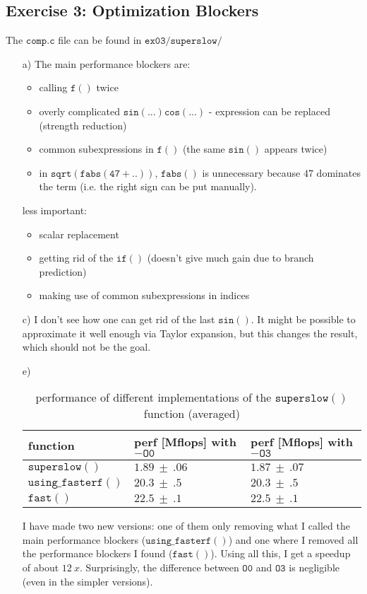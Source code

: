 \documentclass[11pt]{article}
\begin{document}
\subsection*{Exercise 3: Optimization Blockers}
	The $\mathtt{comp.c}$ file can be found in $\mathtt{ex03/superslow/}$
	\begin{itemize}
		\item[a)] The main performance blockers are:
		\begin{itemize}
			\item calling $\mathtt{f()}$ twice
			\item overly complicated $\mathtt{sin(...)cos(...)}$ - expression can be replaced (strength reduction)
			\item common subexpressions in $\mathtt{f()}$ (the same $\mathtt{sin()}$ appears twice)
			\item in $\mathtt{sqrt(fabs(47 + ..))}$, $\mathtt{fabs()}$ is unnecessary because $47$ dominates the term (i.e. the right sign can be put manually).
		\end{itemize}
		less important:
		\begin{itemize}
			\item scalar replacement
			\item getting rid of the $\mathtt{if()}$ (doesn't give much gain due to branch prediction)
			\item making use of common subexpressions in indices
		\end{itemize}
		\item[c)] I don't see how one can get rid of the last $\mathtt{sin()}$. It might be possible to approximate it well enough via Taylor expansion, but this changes the result, which should not be the goal.
	\item[e)]
	\begin{table}[H]\centering
		\begin{tabular}  {l||l|l}
			function & perf [Mflops] with $-\mathtt{O0}$& perf [Mflops] with $-\mathtt{O3}$\\\hline\hline
			$\mathtt{superslow()}$&$1.89~\pm~.06$ & $1.87~\pm~.07$\\\hline
			$\mathtt{using\_fasterf()}$&$20.3~\pm~.5$ & $20.3~\pm~.5$\\\hline
			$\mathtt{fast()}$&$22.5~\pm~.1$ & $22.5~\pm~.1$\\
			
		\end{tabular}
		\caption{performance of different implementations of the $\mathtt{superslow()}$ function (averaged)}
	\end{table}
	I have made two new versions: one of them only removing what I called the main performance blockers ($\mathtt{using\_fasterf()}$) and one where I removed all the performance blockers I found ($\mathtt{fast()}$). Using all this, I get a speedup of about $12 ~x$. Surprisingly, the difference between $\mathtt{O0}$ and $\mathtt{O3}$ is negligible (even in the simpler versions).
	\end{itemize}
\end{document}
